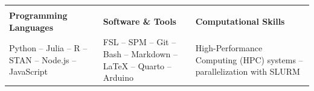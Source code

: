 \documentclass[11pt,a4paper,]{awesome-cv}
\begin{document}
\begin{table}[H]
\centering\begingroup\fontsize{10}{12}\selectfont

\begin{tabular}{>{\centering\arraybackslash}p{4.75cm}|>{\centering\arraybackslash}p{4.755cm}|>{\centering\arraybackslash}p{4.75cm}}

\multicolumn{3}{c}{ } \\
\textcolor[HTML]{009acd}{\textbf{Programming Languages}} & \textcolor[HTML]{009acd}{\textbf{Software \& Tools}} & \textcolor[HTML]{009acd}{\textbf{Computational Skills}}\\

\textcolor[HTML]{7f7f7f}{Python -- Julia -- R -- STAN -- Node.js -- JavaScript} & \textcolor[HTML]{7f7f7f}{FSL -- SPM -- Git -- Bash -- Markdown -- LaTeX -- Quarto -- Arduino} & \textcolor[HTML]{7f7f7f}{High-Performance Computing (HPC) systems -- parallelization with SLURM}\\

\end{tabular}
\endgroup{}
\end{table}
\end{document}
